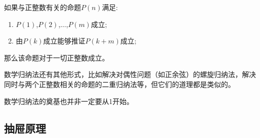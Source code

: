 \begin{principle}[跳跃数学归纳法]
  如果与正整数有关的命题$P(n)$满足:
  \begin{enumerate}
  \item $P(1)$,$P(2)$,$\ldots$,$P(m)$成立;
  \item 由$P(k)$成立能够推证$P(k+m)$成立;
  \end{enumerate}
那么该命题对于一切正整数成立。
\end{principle}

数学归纳法还有其他形式，比如解决对偶性问题（如正余弦）的螺旋归纳法，解决同时与两个正整数相关的命题的二重归纳法等，但它们的道理都是类似的。

数学归纳法的奠基也并非一定要从1开始。


\subsection{抽屉原理}
\label{sec:drawer-principle}



